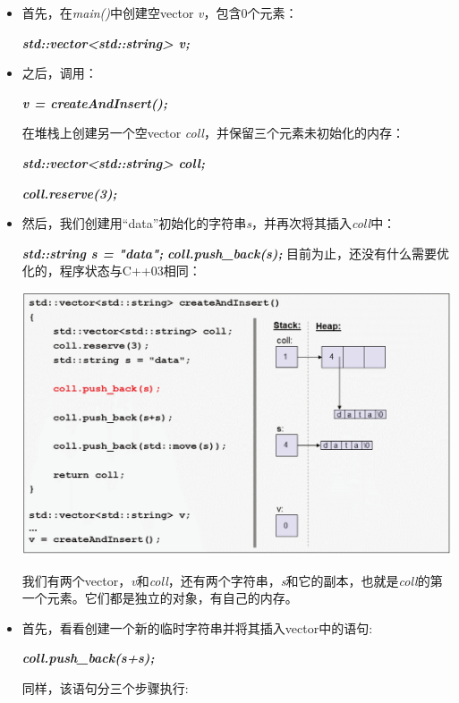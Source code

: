 \begin{itemize}
	\item 首先，在\textit{main()}中创建空vector \textit{v}，包含0个元素：\par
	\textit{\textbf{std::vector<std::string> v;}}
	\item 之后，调用：\par
	\textit{\textbf{v = createAndInsert();}}\par
	在堆栈上创建另一个空vector \textit{coll}，并保留三个元素未初始化的内存：\par
	\textit{\textbf{std::vector<std::string> coll;}}\par
	\textit{\textbf{coll.reserve(3);}}\par
	\item 然后，我们创建用“data”初始化的字符串\textit{s}，并再次将其插入\textit{coll}中：\par
	\textit{\textbf{std::string s = "data";}}
	\textit{\textbf{coll.push\_back(s);}}
	目前为止，还没有什么需要优化的，程序状态与C++03相同：\par
	\begin{center}
		\includegraphics[width=1.0\textwidth]{content/1/chapter1/images/10}
	\end{center}
	我们有两个vector，\textit{v}和\textit{coll}，还有两个字符串，\textit{s}和它的副本，也就是\textit{coll}的第一个元素。它们都是独立的对象，有自己的内存。\par
	\item 首先，看看创建一个新的临时字符串并将其插入vector中的语句:\par
	\textit{\textbf{coll.push\_back(s+s);}}\par
	同样，该语句分三个步骤执行:\par
	\begin{enumerate}

\end{enumerate}
\end{itemize}
